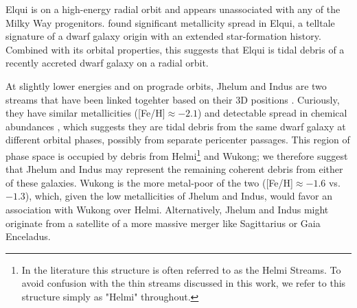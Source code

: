 \documentclass[twocolumn]{aastex63}
\begin{document}

Elqui is on a high-energy radial orbit and appears unassociated with any of the Milky Way progenitors.
\citet{ji2020} found significant metallicity spread in Elqui, a telltale signature of a dwarf galaxy origin with an extended star-formation history.
Combined with its orbital properties, this suggests that Elqui is tidal debris of a recently accreted dwarf galaxy on a radial orbit.

At slightly lower energies and on prograde orbits, Jhelum and Indus are two streams that have been linked togehter based on their 3D positions \citep{bonaca2019b}.
Curiously, they have similar metallicities ([Fe/H]$\approx-2.1$) and detectable spread in chemical abundances \citep{ji2020}, which suggests they are tidal debris from the same dwarf galaxy at different orbital phases, possibly from separate pericenter passages.
This region of phase space is occupied by debris from Helmi\footnote{In the literature this structure is often referred to as the Helmi Streams.  To avoid confusion with the thin streams discussed in this work, we refer to this structure simply as "Helmi" throughout.} and Wukong; we therefore suggest that Jhelum and Indus may represent the remaining coherent debris from either of these galaxies.
Wukong is the more metal-poor of the two ([Fe/H]$\approx-1.6$ vs. $-1.3$), which, given the low metallicities of Jhelum and Indus, would favor an association with Wukong over Helmi.
Alternatively, Jhelum and Indus might originate from a satellite of a more massive merger like Sagittarius or Gaia Enceladus.
\end{document}
